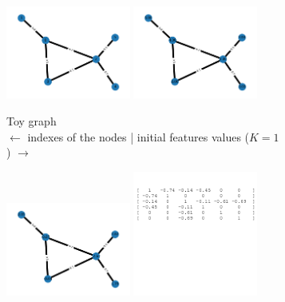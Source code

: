  \begin{figure}
    \centering
    \begin{subfigure}{0.45\textwidth}
        \centering
        \includegraphics[width=0.45\textwidth]{figures/toy_graph_init.png}
        \includegraphics[width=0.45\textwidth]{figures/toy_graph_conv_K1.png}
        \caption{Toy graph\\ $\leftarrow$ indexes of the nodes | initial features values ($K=1$) $\rightarrow$}
    \end{subfigure}
    \hfill
    \begin{subfigure}{0.45\textwidth}
        \centering
        \includegraphics[width=0.45\textwidth]{figures/toy_graph_conv_K2.png}
        \includegraphics[width=0.45\textwidth]{figures/lap1.png}

\end{subfigure}
\end{figure}
